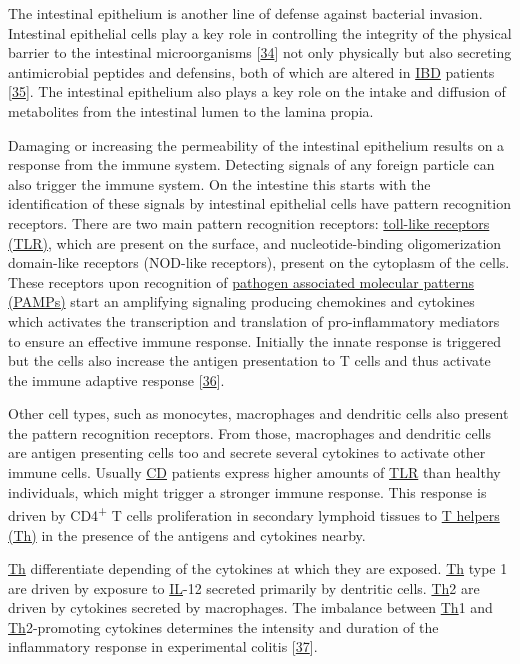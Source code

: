 \documentclass[
  12pt,
  a4paper,
  twoside,
  openright]{book}
\begin{document}
The intestinal epithelium is another line of defense against bacterial invasion.
Intestinal epithelial cells play a key role in controlling the integrity of the physical barrier to the intestinal microorganisms {[}\protect\hyperlink{ref-hisamatsu2013}{34}{]} not only physically but also secreting antimicrobial peptides and defensins, both of which are altered in \protect\hyperlink{acronyms_IBD}{IBD} patients {[}\protect\hyperlink{ref-michielan2015}{35}{]}.
The intestinal epithelium also plays a key role on the intake and diffusion of metabolites from the intestinal lumen to the lamina propia.

Damaging or increasing the permeability of the intestinal epithelium results on a response from the immune system.
Detecting signals of any foreign particle can also trigger the immune system.
On the intestine this starts with the identification of these signals by intestinal epithelial cells have pattern recognition receptors.
There are two main pattern recognition receptors: \protect\hyperlink{acronyms_TLR}{toll-like receptors (TLR)}, which are present on the surface, and nucleotide-binding oligomerization domain-like receptors (NOD-like receptors), present on the cytoplasm of the cells.
These receptors upon recognition of \protect\hyperlink{acronyms_PAMPs}{pathogen associated molecular patterns (PAMPs)} start an amplifying signaling producing chemokines and cytokines which activates the transcription and translation of pro-inflammatory mediators to ensure an effective immune response.
Initially the innate response is triggered but the cells also increase the antigen presentation to T cells and thus activate the immune adaptive response {[}\protect\hyperlink{ref-mayorgas2021a}{36}{]}.

Other cell types, such as monocytes, macrophages and dendritic cells also present the pattern recognition receptors.
From those, macrophages and dendritic cells are antigen presenting cells too and secrete several cytokines to activate other immune cells.
Usually \protect\hyperlink{acronyms_CD}{CD} patients express higher amounts of \protect\hyperlink{acronyms_TLR}{TLR} than healthy individuals, which might trigger a stronger immune response.
This response is driven by CD4\textsuperscript{+} T cells proliferation in secondary lymphoid tissues to \protect\hyperlink{acronyms_Th}{T helpers (Th)} in the presence of the antigens and cytokines nearby.

\protect\hyperlink{acronyms_Th}{Th} differentiate depending of the cytokines at which they are exposed.
\protect\hyperlink{acronyms_Th}{Th} type 1 are driven by exposure to \protect\hyperlink{acronyms_IL}{IL}-12 secreted primarily by dentritic cells.
\protect\hyperlink{acronyms_Th}{Th}2 are driven by cytokines secreted by macrophages.
The imbalance between \protect\hyperlink{acronyms_Th}{Th}1 and \protect\hyperlink{acronyms_Th}{Th}2-promoting cytokines determines the intensity and duration of the inflammatory response in experimental colitis {[}\protect\hyperlink{ref-neurath1996}{37}{]}.
\end{document}
